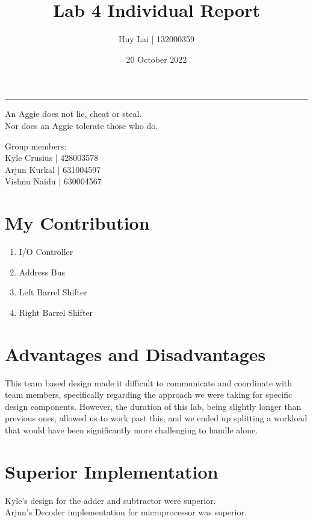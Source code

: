 \documentclass[fleqn,12pt]{article}
\title{\vspace{-2.5cm}Lab 4 Individual Report}
\author{
    Huy Lai | 132000359
}
\affil{Texas A\&M University}
\date{\vspace{-28pt}20 October 2022}
\begin{document}
\maketitle
\begin{center}
\vspace{-42pt}
\rule{\textwidth}{.1pt}
{\large
An Aggie does not lie, cheat or steal.\\
Nor does an Aggie tolerate those who do.
}
\end{center}
\begin{center}
Group members:\\
Kyle Crusius | 428003578\\
Arjun Kurkal | 631004597\\
Vishnu Naidu | 630004567
\end{center}

\section*{My Contribution}
\begin{enumerate}
    \item I/O Controller
    \item Address Bus
    \item Left Barrel Shifter
    \item Right Barrel Shifter
\end{enumerate}

\section*{Advantages and Disadvantages}
\noindent
This team based design made it difficult to communicate and coordinate with team members, specifically regarding the approach we were taking for specific design components. However, the duration of this lab, being slightly longer than previous ones, allowed us to work past this, and we ended up splitting a workload that would have been significantly more challenging to handle alone.

\section*{Superior Implementation}
\noindent
Kyle's design for the adder and subtractor were superior.\\
Arjun's Decoder implementation for microprocessor was superior.
\end{document}
